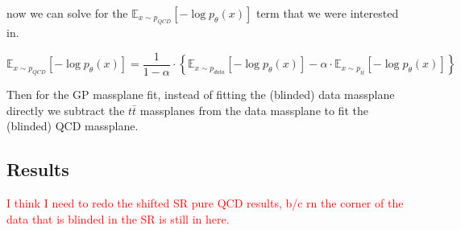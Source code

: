 now we can solve for the $\mathbb{E}_{x \sim p_{QCD}}[-\log p_\theta (x)]$ term that we were interested in.

\begin{equation}
\mathbb{E}_{x \sim p_{QCD}}[-\log p_\theta (x)] = \frac{1}{1-\alpha}\cdot \left\{ \mathbb{E}_{x \sim p_{data}}[-\log p_\theta (x)] - \alpha \cdot \mathbb{E}_{x \sim p_{t\bar{t}}}[-\log p_\theta (x)] \right\}
\end{equation}

Then for the GP massplane fit, instead of fitting the (blinded) data massplane directly we subtract the $t\bar{t}$ massplanes from the data massplane to fit the (blinded) QCD massplane.

\subsection{Results}
\label{subsec:qcd-results}

\textcolor{red}{I think I need to redo the shifted SR pure QCD results, b/c rn the corner of the data that is blinded in the SR is still in here.}